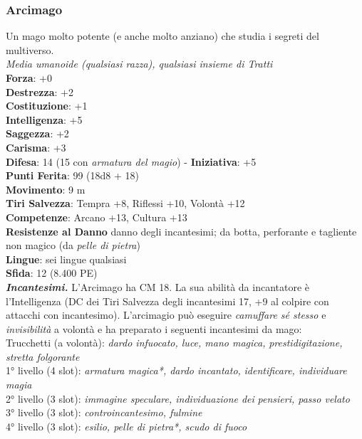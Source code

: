 \begin{multicols}{2}
\subsubsection{Arcimago}
Un mago molto potente (e anche molto anziano) che studia i segreti del multiverso.\\
\emph{Media umanoide (qualsiasi razza), qualsiasi insieme di Tratti}\\
\textbf{Forza}: +0\\
\textbf{Destrezza}: +2\\
\textbf{Costituzione}: +1\\
\textbf{Intelligenza}: +5\\
\textbf{Saggezza}: +2\\
\textbf{Carisma}: +3\\
\textbf{Difesa}: 14 (15 con \emph{armatura del magio}) - \textbf{Iniziativa}: +5\\
\textbf{Punti Ferita}: 99 (18d8 + 18)\\
\textbf{Movimento}: 9 m\\
\textbf{Tiri Salvezza}: Tempra +8, Riflessi +10, Volontà +12 \\
\textbf{Competenze}: Arcano +13, Cultura +13\\
\textbf{Resistenze al Danno} danno degli incantesimi; da botta, perforante e tagliente non magico (da \emph{pelle di pietra})\\
\textbf{Lingue}: sei lingue qualsiasi\\
\textbf{Sfida}: 12 (8.400 PE)\smallskip\\
\emph{\textbf{Incantesimi.}} L'Arcimago ha CM 18. La sua abilità da incantatore è l'Intelligenza (DC dei Tiri Salvezza degli incantesimi 17, +9 al colpire con attacchi con incantesimo). L'arcimagio può eseguire \emph{camuffare sé stesso} e \emph{invisibilità} a volontà e ha preparato i seguenti incantesimi da mago:\\
Trucchetti (a volontà): \emph{dardo infuocato, luce, mano magica,} \emph{prestidigitazione, stretta folgorante}\\
1° livello (4 slot): \emph{armatura magica*, dardo incantato,} \emph{identificare, individuare magia}\\
2° livello (3 slot): \emph{immagine speculare, individuazione dei} \emph{pensieri, passo velato}\\
3° livello (3 slot): \emph{controincantesimo, fulmine}\\
4° livello (3 slot): \emph{esilio, pelle di pietra*, scudo di fuoco}\\

\end{multicols}
